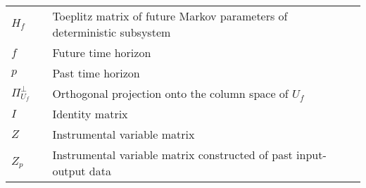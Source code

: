 {\begin{longtable}{lll}
$H_f$				&& Toeplitz matrix of future Markov parameters of deterministic subsystem\\
$f$					&& Future time horizon\\
$p$					&& Past time horizon\\
$\Pi_{U_f}^\perp$ 	&& Orthogonal projection onto the column space of $U_f$\\
$I$					&& Identity matrix\\
$Z$					&& Instrumental variable matrix\\
$Z_p$				&& Instrumental variable matrix constructed of past input-output data\\
\end{longtable}

}